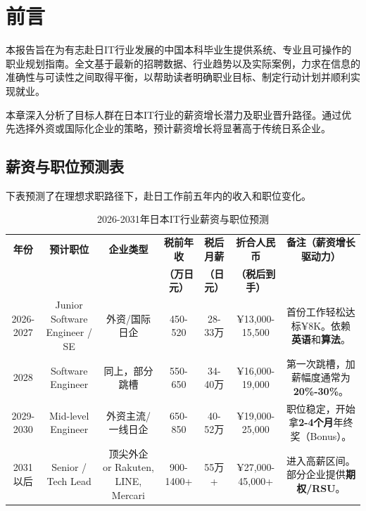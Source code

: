 \documentclass[12pt, a4paper]{ctexart}
\begin{document}
\begin{abstract}
本报告系统阐述了中国本科毕业生赴日本信息技术行业的职业发展路径，涵盖薪资趋势、岗位晋升、目标企业及行动计划。基于2025年最新招聘数据与案例分析，提供可操作的步骤建议，帮助读者制定明确的职业目标并实现高薪就业。
\end{abstract}

\section{前言}
本报告旨在为有志赴日IT行业发展的中国本科毕业生提供系统、专业且可操作的职业规划指南。全文基于最新的招聘数据、行业趋势以及实际案例，力求在信息的准确性与可读性之间取得平衡，以帮助读者明确职业目标、制定行动计划并顺利实现就业。

本章深入分析了目标人群在日本IT行业的薪资增长潜力及职业晋升路径。通过优先选择外资或国际化企业的策略，预计薪资增长将显著高于传统日系企业。

\subsection{薪资与职位预测表}

下表预测了在理想求职路径下，赴日工作前五年内的收入和职位变化。

\begin{table}[h]
    \centering
    \caption{2026-2031年日本IT行业薪资与职位预测}
    \label{tab:salary_predict}
    \begin{tabular}{cccccc|c}
        \toprule
        \textbf{年份} & \textbf{预计职位} & \textbf{企业类型} & \textbf{税前年收} & \textbf{税后月薪} & \textbf{折合人民币} & \textbf{备注（薪资增长驱动力）} \\
        & & & \textbf{（万日元）} & \textbf{（日元）} & \textbf{（税后到手）} & \\
        \midrule
        2026-2027 & Junior Software Engineer / SE & 外资/国际日企 & 450-520 & 28-33万 & ¥13,000-15,500 & 首份工作轻松达标¥8K。依赖\textbf{英语}和\textbf{算法}。 \\
        2028 & Software Engineer & 同上，部分跳槽 & 550-650 & 34-40万 & ¥16,000-19,000 & 第一次跳槽，加薪幅度通常为\textbf{20\%-30\%}。 \\
        2029-2030 & Mid-level Engineer & 外资主流/一线日企 & 650-850 & 40-52万 & ¥19,000-25,000 & 职位稳定，开始拿\textbf{2-4个月}年终奖（Bonus）。 \\
        2031以后 & Senior / Tech Lead & 顶尖外企 or Rakuten, LINE, Mercari & 900-1400+ & 55万+ & ¥27,000-45,000+ & 进入高薪区间。部分企业提供\textbf{期权/RSU}。 \\
        \bottomrule
    \end{tabular}
\end{table}
\end{document}
